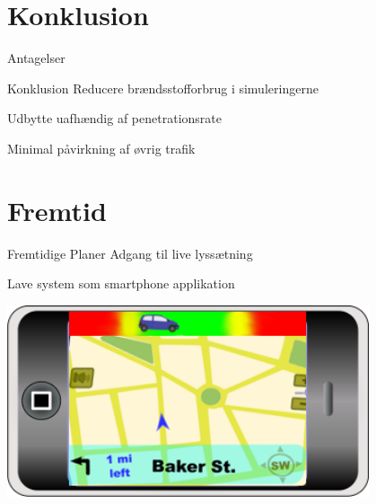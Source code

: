 \section{Konklusion}
\begin{frame}{Antagelser}
\end{frame}

\begin{frame}{Konklusion}
Reducere brændsstofforbrug i simuleringerne

Udbytte uafhændig af penetrationsrate

Minimal påvirkning af øvrig trafik
\end{frame}

\section{Fremtid}
\begin{frame}{Fremtidige Planer}
Adgang til live lyssætning

Lave system som smartphone applikation

\vspace{1cm}
\begin{center}
\includegraphics[width=0.8\textwidth]{images/product.png}
\end{center}
\end{frame}
